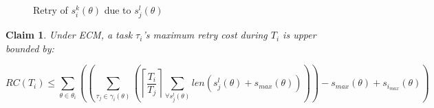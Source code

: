 \documentclass[12pt,english]{report}
\newtheorem{clm}{Claim}
\begin{document}
\begin{figure}
{\label{fig5-c} 
}
\caption{Retry of $s_i^k(\theta)$ due to $s_j^l(\theta)$}  
\label{fig5}
\end{figure}


\begin{clm}\label{gedf-edf}
Under ECM, a task $\tau_i$'s maximum retry cost during $T_i$ is upper bounded by:
 
\begin{equation}
RC\left(T_{i}\right) \le \sum_{\theta\in\theta_{i}}\left(\left(\sum_{\tau_{j}\in\gamma_i(\theta)}\left(\left\lceil\frac{T_{i}}{T_{j}}\right\rceil\sum_{\forall s_{j}^{l}(\theta)}len\left(s_{j}^{l}(\theta) + s_{max}(\theta)\right)\right)\right)-s_{max}(\theta)+s_{i_{max}}(\theta)\right)\label{eq3}\end{equation}
 
 
\end{clm}
\end{document}
